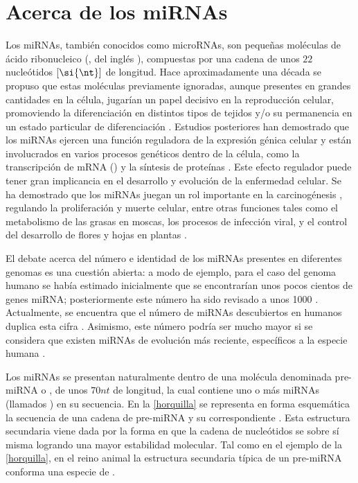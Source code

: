 \section{Acerca de los miRNAs}
Los miRNAs, también conocidos como microRNAs, son pequeñas moléculas
de ácido ribonucleico (, del inglés ),
compuestas por una cadena de unos $22$ nucleótidos $[\si{\nt}]$ de
longitud.  Hace aproximadamente una década se propuso que estas
moléculas previamente ignoradas, aunque presentes en grandes
cantidades en la célula, jugarían un papel decisivo en la reproducción
celular, promoviendo la diferenciación en distintos tipos de tejidos
y/o su permanencia en un estado particular de diferenciación
\cite{lee-mammal}.  Estudios posteriores han demostrado que los miRNAs
ejercen una función reguladora de la expresión génica celular
\cite{bartel116} y están involucrados en varios procesos genéticos
dentro de la célula, como la transcripción de mRNA () y la síntesis de proteínas \cite{lili}.  Este efecto
regulador puede tener gran implicancia en el desarrollo y evolución de
la enfermedad celular. Se ha demostrado que los miRNAs juegan un rol
importante en la carcinogénesis \cite{aurora}\cite{lili}, regulando la
proliferación y muerte celular, entre otras funciones tales como el
metabolismo de las grasas en moscas, los procesos de infección viral,
y el control del desarrollo de flores y hojas en plantas
\cite{bartel116}\cite{lecellier}.

El debate acerca del número e identidad de los miRNAs presentes en
diferentes genomas es una cuestión abierta: a modo de ejemplo, para el
caso del genoma humano se había estimado inicialmente que se
encontrarían unos pocos cientos de genes miRNA; posteriormente este
número ha sido revisado a unos 1000 \cite{sewer}\cite{chang}.
Actualmente, se encuentra que el número de miRNAs descubiertos en
humanos duplica esta cifra \cite{gomes}. Asimismo, este número podría
ser mucho mayor si se considera que existen miRNAs de evolución más
reciente, específicos a la especie humana \cite{sewer}.

Los miRNAs se presentan naturalmente dentro de una molécula denominada
pre-miRNA o , de unos $70 \si{nt}$ de longitud, la
cual contiene uno o más miRNAs (llamados ) en su
secuencia. En la \autoref{horquilla} se representa en forma
esquemática la secuencia de una cadena de pre-miRNA y su
correspondiente . Esta estructura secundaria
viene dada por la forma en que la cadena de nucleótidos se 
sobre sí misma logrando una mayor estabilidad molecular. Tal como en
el ejemplo de la \autoref{horquilla}, en el reino animal la estructura
secundaria típica de un pre-miRNA conforma una especie de
 \cite{bartel116}\cite{sewer}.